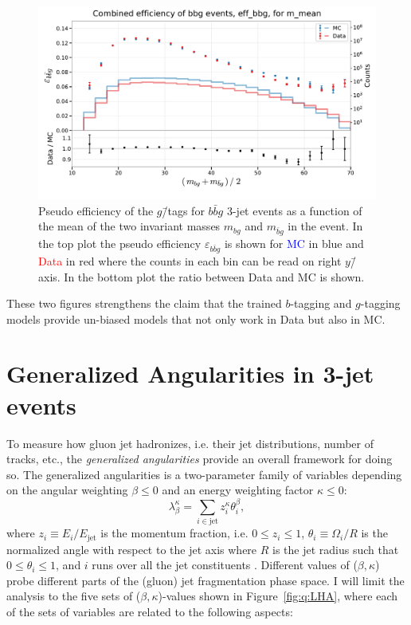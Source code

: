 \begin{figure}[h!]
  \centerfloat
  \includegraphics[width=1.1\textwidth, trim=10 20 5 40, clip]{figures/quarks/eff_bbg_m_mean-down_sample=1.00-ML_vars=vertex-selection=b-ejet_min=4-n_iter_RS_lgb=99-n_iter_RS_xgb=9-cdot_cut=0.90-version=19.pdf}
  \caption[$g$\=/Tagging Pseudo Efficiency for $b\bar{b}g$\=/Events as a Function of The Mean Invariant Mass]
          {Pseudo efficiency of the $g$\=/tags for $b\bar{b}g$ 3-jet events as a function of the mean of the two invariant masses $m_{bg}$ and $m_{\bar{b}g}$ in the event. In the top plot the pseudo efficiency $\varepsilon_{b\bar{b}g}$ is shown for \textcolor{blue}{MC} in blue and \textcolor{red}{Data} in red where the counts in each bin can be read on right $y$\=/axis. In the bottom plot the ratio between Data and MC is shown.} 
  \label{fig:q:effiency_btag_bbg_m_mean}
\end{figure}

These two figures strengthens the claim that the trained $b$-tagging and $g$-tagging models provide un-biased models that not only work in Data but also in MC. 

\section{Generalized Angularities in 3-jet events}
\label{sec:q:generalized_angularities_3j}

To measure how gluon jet hadronizes, i.e. their jet distributions, number of tracks, etc., the \emph{generalized angularities} provide an overall framework for doing so. The generalized angularities is a two-parameter family of variables depending on the angular weighting $\beta \leq 0$ and an energy weighting factor $\kappa \leq 0$:
\begin{equation}
  \lambda_\beta^\kappa = \sum_{i \in \mathrm{jet}} z_i^\kappa \theta_i^\beta,
\end{equation}
where $z_i \equiv E_i / E_\mathrm{jet}$ is the momentum fraction, i.e. $0 \leq z_i \leq 1$, $\theta_i \equiv \Omega_i / R$ is the normalized angle with respect to the jet axis where $R$ is the jet radius such that $0 \leq \theta_i \leq 1$, and $i$ runs over all the jet constituents \citep{grasSystematicsQuarkGluon2017,larkoskiGainingMutualInformation2014}. Different values of ($\beta, \kappa$) probe different parts of the (gluon) jet fragmentation phase space. I will limit the analysis to the five sets of ($\beta, \kappa$)-values shown in Figure~\ref{fig:q:LHA}, where each of the sets of variables are related to the following aspects:

